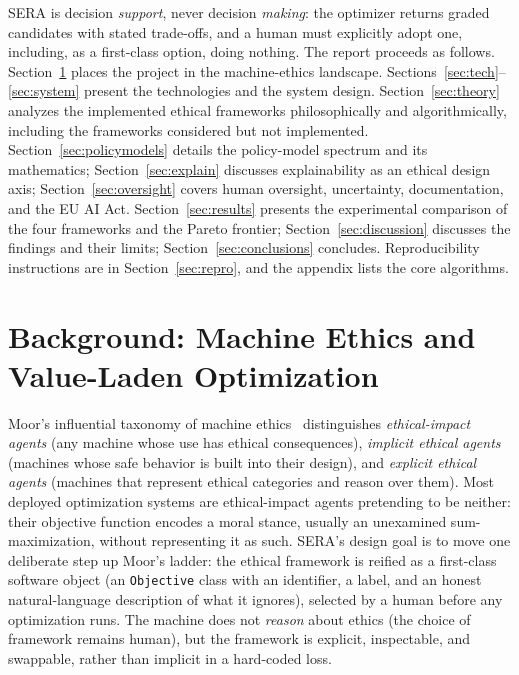 \documentclass[11pt,a4paper]{article}
\newcommand{\code}[1]{\texttt{#1}}
\begin{document}
SERA is decision \emph{support}, never decision \emph{making}: the optimizer
returns graded candidates with stated trade-offs, and a human must explicitly
adopt one, including, as a first-class option, doing nothing. The report
proceeds as follows. Section~\ref{sec:background} places the project in the
machine-ethics landscape. Sections~\ref{sec:tech}--\ref{sec:system} present the
technologies and the system design. Section~\ref{sec:theory} analyzes the
implemented ethical frameworks philosophically and algorithmically, including
the frameworks considered but not implemented.
Section~\ref{sec:policymodels} details the policy-model spectrum and its
mathematics; Section~\ref{sec:explain} discusses explainability as an ethical
design axis; Section~\ref{sec:oversight} covers human oversight, uncertainty,
documentation, and the EU AI Act. Section~\ref{sec:results} presents the
experimental comparison of the four frameworks and the Pareto frontier;
Section~\ref{sec:discussion} discusses the findings and their limits;
Section~\ref{sec:conclusions} concludes. Reproducibility instructions are in
Section~\ref{sec:repro}, and the appendix lists the core algorithms.

\section{Background: Machine Ethics and Value-Laden Optimization}
\label{sec:background}

Moor's influential taxonomy of machine ethics~\cite{moor2006} distinguishes
\emph{ethical-impact agents} (any machine whose use has ethical consequences),
\emph{implicit ethical agents} (machines whose safe behavior is built into
their design), and \emph{explicit ethical agents} (machines that represent
ethical categories and reason over them). Most deployed optimization systems
are ethical-impact agents pretending to be neither: their objective function
encodes a moral stance, usually an unexamined sum-maximization, without
representing it as such. SERA's design goal is to move one deliberate step up
Moor's ladder: the ethical framework is reified as a first-class software
object (an \code{Objective} class with an identifier, a label, and an honest
natural-language description of what it ignores), selected by a human before
any optimization runs. The machine does not \emph{reason} about ethics (the
choice of framework remains human), but the framework is explicit,
inspectable, and swappable, rather than implicit in a hard-coded loss.
\end{document}
